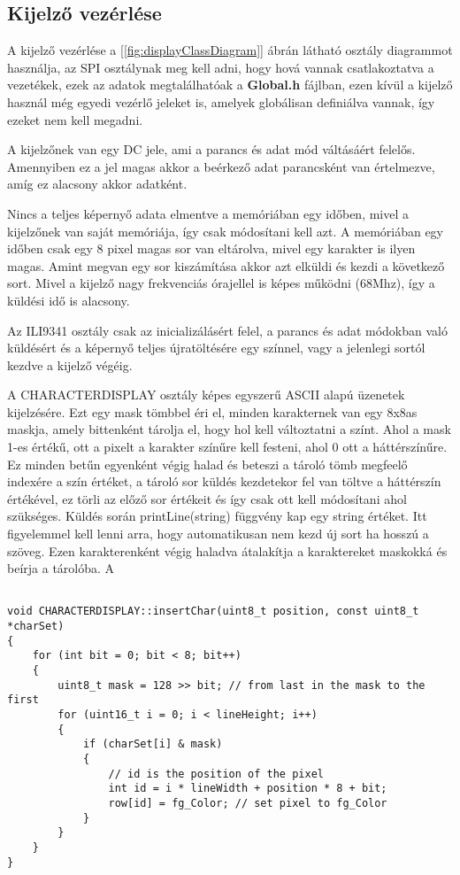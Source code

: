 \subsection{Kijelző vezérlése}

A kijelző vezérlése a [\ref{fig:displayClassDiagram}] ábrán látható osztály diagrammot használja, 
az SPI osztálynak meg kell adni, hogy hová vannak csatlakoztatva a vezetékek, 
ezek az adatok megtalálhatóak a \textbf{Global.h} fájlban, ezen kívül a 
kijelző használ még egyedi vezérlő jeleket is, amelyek globálisan definiálva vannak,
így ezeket nem kell megadni. 

A kijelzőnek van egy DC jele, ami a parancs és adat mód váltásáért felelős.
Amennyiben ez a jel magas akkor a beérkező adat parancsként van értelmezve, amíg 
ez alacsony akkor adatként.

Nincs a teljes képernyő adata elmentve a memóriában egy időben, mivel a kijelzőnek
van saját memóriája, így csak módosítani kell azt. A memóriában egy időben csak 
egy 8 pixel magas sor van eltárolva, mivel egy karakter is ilyen magas.
Amint megvan egy sor kiszámítása akkor azt elküldi és kezdi a következő sort.
Mivel a kijelző nagy frekvenciás órajellel is képes működni (68Mhz), így a küldési
idő is alacsony.

Az ILI9341 osztály csak az inicializálásért felel, a parancs és adat 
módokban való küldésért és a képernyő teljes újratöltésére egy színnel, vagy a jelenlegi
sortól kezdve a kijelző végéig.

A CHARACTERDISPLAY osztály képes egyszerű ASCII alapú üzenetek kijelzésére.
Ezt egy mask tömbbel éri el, minden karakternek van egy 8x8as maskja, amely
bittenként tárolja el, hogy hol kell változtatni a színt.
Ahol a mask 1-es értékű, ott a pixelt a karakter színűre kell festeni, ahol 0
ott a háttérszínűre.
Ez minden betűn egyenként végig halad és beteszi a tároló tömb megfeelő indexére
a szín értéket, a tároló sor küldés kezdetekor fel van töltve a háttérszín 
értékével, ez törli az előző sor értékeit és így csak ott kell módosítani
ahol szükséges.
Küldés során printLine(string) függvény kap egy string értéket.
Itt figyelemmel kell lenni arra, hogy automatikusan nem kezd új sort
ha hosszú a szöveg. Ezen karakterenként végig haladva átalakítja a karaktereket maskokká
és beírja a tárolóba. A 


\begin{lstlisting}

void CHARACTERDISPLAY::insertChar(uint8_t position, const uint8_t *charSet)
{
    for (int bit = 0; bit < 8; bit++)
    {
        uint8_t mask = 128 >> bit; // from last in the mask to the first
        for (uint16_t i = 0; i < lineHeight; i++)
        {
            if (charSet[i] & mask)
            {
                // id is the position of the pixel
                int id = i * lineWidth + position * 8 + bit;
                row[id] = fg_Color; // set pixel to fg_Color
            }
        }
    }
}

\end{lstlisting}


